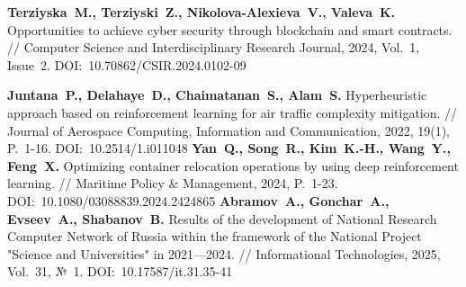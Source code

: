 \begin{thebibliography}{99}
%
\textbf{Terziyska~M., Terziyski~Z., Nikolova-Alexieva~V., Valeva~K.} Opportunities to achieve cyber security
through blockchain and smart contracts. // Computer Science and Interdisciplinary Research Journal, 2024, Vol.~1, Issue~2. DOI:~10.70862/CSIR.2024.0102-09
%



%
\textbf{Juntana~P., Delahaye~D., Chaimatanan~S., Alam~S.} Hyperheuristic approach based on reinforcement learning for air traffic complexity mitigation. // Journal of Aerospace Computing, Information and Communication, 2022, 19(1), P.~1-16. DOI:~10.2514/1.i011048
%
\textbf{Yan~Q., Song~R., Kim~K.-H., Wang~Y., Feng~X.} Optimizing container relocation operations by using deep reinforcement learning. // Maritime Policy \& Management, 2024, P.~1-23. DOI:~10.1080/03088839.2024.2424865
%
\textbf{Abramov~A., Gonchar~A., Evseev~A., Shabanov~B.} Results of the development of National Research Computer Network of Russia within the framework of the National Project "Science and Universities" in 2021—2024. // Informational Technologies, 2025, Vol.~31, №~1. DOI:~10.17587/it.31.35-41
%



%




\end{thebibliography}
